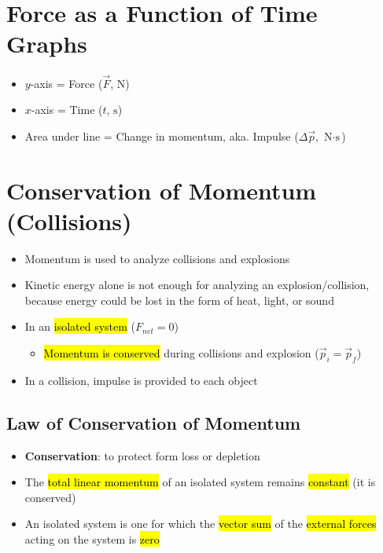 \documentclass[a4paper,12pt]{article}
\begin{document}
\pagebreak

\section{Force as a Function of Time Graphs}
\begin{itemize}
    \item{$y$-axis = Force ($\vec{F}$, $\si{\N}$)}
    \item{$x$-axis = Time ($t$, $\si{\s}$)}
    \item{Area under line = Change in momentum, aka. Impulse ($\Delta{\vec{p}}$, $\si{\N\cdot\s}$)}
\end{itemize}

\section{Conservation of Momentum (Collisions)}
\begin{itemize}
    \item{Momentum is used to analyze collisions and explosions}
    \item{Kinetic energy alone is not enough for analyzing an explosion/collision, because energy could be lost in the form of heat, light, or sound}
    \item{
        In an \hl{isolated system} ($F_{net} = 0$)
        \begin{itemize}
            \item{\hl{Momentum is conserved} during collisions and explosion ($\vec{p}_i = \vec{p}_f$)}
        \end{itemize}
    }
    \item{In a collision, impulse is provided to each object}
\end{itemize}

\subsection{Law of Conservation of Momentum}
\begin{itemize}
    \item{\textbf{Conservation}: to protect form loss or depletion}
    \item{The \hl{total linear momentum} of an isolated system remains \hl{constant} (it is conserved)}
    \item{An isolated system is one for which the \hl{vector sum} of the \hl{external forces} acting on the system is \hl{zero}}
\end{itemize}
\end{document}
